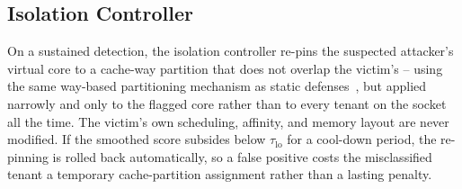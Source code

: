 \subsection{Isolation Controller}

On a sustained detection, the isolation controller re-pins the suspected attacker's virtual
core to a cache-way partition that does not overlap the victim's -- using the same
way-based partitioning mechanism as static defenses~\cite{moreau2016catalyst,delacroix2019dawg},
but applied narrowly and only to the flagged core rather than to every tenant on the socket
all the time. The victim's own scheduling, affinity, and memory layout are never modified.
If the smoothed score subsides below $\tau_{\text{lo}}$ for a cool-down period, the
re-pinning is rolled back automatically, so a false positive costs the misclassified tenant a
temporary cache-partition assignment rather than a lasting penalty.
